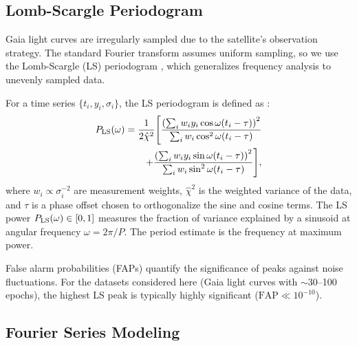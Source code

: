 \documentclass[10pt,preprint2]{aastex}
\begin{document}
\subsection{Lomb-Scargle Periodogram}

Gaia light curves are irregularly sampled due to the satellite's observation strategy. The standard Fourier transform assumes uniform sampling, so we use the Lomb-Scargle (LS) periodogram \citep{Lomb1976, Scargle1982}, which generalizes frequency analysis to unevenly sampled data.

For a time series $\{t_i, y_i, \sigma_i\}$, the LS periodogram is defined as \citep{VanderPlas2018}:
\begin{equation}
  \begin{split}
    P_{\rm LS}(\omega) = \frac{1}{2\hat{\chi}^2} \Biggl[
      \frac{\left(\sum_i w_i y_i \cos\omega(t_i - \tau)\right)^2}{\sum_i w_i \cos^2\omega(t_i-\tau)} \\
      \qquad + \frac{\left(\sum_i w_i y_i \sin\omega(t_i - \tau)\right)^2}{\sum_i w_i \sin^2\omega(t_i-\tau)}
    \Biggr],
  \end{split}
\end{equation}
where $w_i \propto \sigma_i^{-2}$ are measurement weights, $\hat{\chi}^2$ is the weighted variance of the data, and $\tau$ is a phase offset chosen to orthogonalize the sine and cosine terms. The LS power $P_{\rm LS}(\omega) \in [0, 1]$ measures the fraction of variance explained by a sinusoid at angular frequency $\omega = 2\pi/P$. The period estimate is the frequency at maximum power.

False alarm probabilities (FAPs) quantify the significance of peaks against noise fluctuations. For the datasets considered here (Gaia light curves with $\sim$30--100 epochs), the highest LS peak is typically highly significant ($\mathrm{FAP} \ll 10^{-10}$).

\subsection{Fourier Series Modeling}
\end{document}
